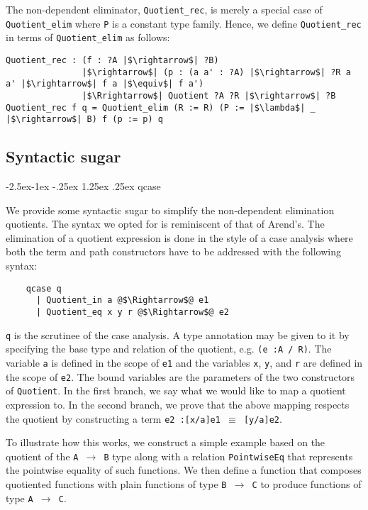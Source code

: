 \documentclass[12pt,twoside,maitrise]{dms}
\makeatletter
\theoremstyle{definition}
\numberwithin{equation}{section}
\numberwithin{table}{chapter}
\numberwithin{figure}{chapter}
\newcommand\id[1] {\texttt{#1}}
\newcommand\fn[1] {\texttt{#1}}
\renewcommand\paragraph{\@startsection{paragraph}{4}{\z@}%
            {-2.5ex\@plus -1ex \@minus -.25ex}%
            {1.25ex \@plus .25ex}%
            {\normalfont\normalsize\bfseries}}
\makeatother
\begin{document}
The non-dependent eliminator, \id{Quotient\_rec}, is merely a special case of
\id{Quotient\_elim} where \id{P} is a constant type family. Hence, we define
\id{Quotient\_rec} in terms of \id{Quotient\_elim} as follows:

\begin{verbatim}
Quotient_rec : (f : ?A |$\rightarrow$| ?B)
               |$\rightarrow$| (p : (a a' : ?A) |$\rightarrow$| ?R a a' |$\rightarrow$| f a |$\equiv$| f a')
               |$\Rrightarrow$| Quotient ?A ?R |$\rightarrow$| ?B
Quotient_rec f q = Quotient_elim (R := R) (P := |$\lambda$| _ |$\rightarrow$| B) f (p := p) q
\end{verbatim}

\subsection{Syntactic sugar}

\paragraph{qcase}

We provide some syntactic sugar to simplify the non-dependent elimination
quotients. The syntax we opted for is reminiscent of that of
Arend's\cite{arend}. The elimination of a quotient expression is done in the
style of a case analysis where both the term and path constructors have to be
addressed with the following syntax:

\begin{verbatim}
    qcase q
      | Quotient_in a @$\Rightarrow$@ e1
      | Quotient_eq x y r @$\Rightarrow$@ e2
\end{verbatim}

\id{q} is the scrutinee of the case analysis. A type annotation may be given to it
by specifying the base type and relation of the quotient, e.g. \fn{(e :\@ A / R)}.
The variable \id{a} is defined in the scope of \id{e1} and the variables \id{x},
\id{y}, and \id{r} are defined in the scope of \id{e2}. The bound variables are
the parameters of the two constructors of \id{Quotient}. In the first branch, we
say what we would like to map a quotient expression to. In the second branch, we
prove that the above mapping respects the quotient by constructing a term
\fn{e2 :\@ [x/a]e1 $\equiv$ [y/a]e2}.

To illustrate how this works, we construct a simple example based on the
quotient of the \id{A $\rightarrow$ B} type along with a relation
\id{PointwiseEq} that represents the pointwise equality of such functions. We
then define a function that composes quotiented functions with plain functions
of type \id{B $\rightarrow$ C} to produce functions of type \id{A $\rightarrow$
  C}.
\end{document}

